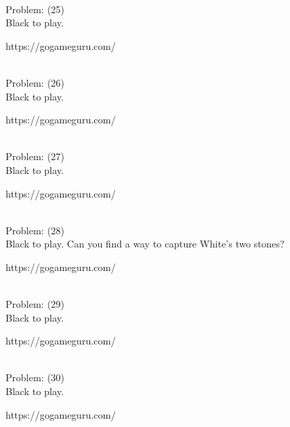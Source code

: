 \documentclass[11pt]{article}
\begin{document}
\begin{minipage}[t]{0.5\textwidth}
  {\centering
  
\\
  Problem: (25)\\
  Black to play.

https://gogameguru.com/\\
  }
\end{minipage}
\begin{minipage}[t]{0.5\textwidth}
  {\centering
  
\\
  Problem: (26)\\
  Black to play.

https://gogameguru.com/\\
  }
\end{minipage}
\begin{minipage}[t]{0.5\textwidth}
  {\centering
  
\\
  Problem: (27)\\
  Black to play.

https://gogameguru.com/\\
  }
\end{minipage}
\begin{minipage}[t]{0.5\textwidth}
  {\centering
  
\\
  Problem: (28)\\
  Black to play. Can you find a way to capture White's two stones?

https://gogameguru.com/\\
  }
\end{minipage}
\begin{minipage}[t]{0.5\textwidth}
  {\centering
  
\\
  Problem: (29)\\
  Black to play.

https://gogameguru.com/\\
  }
\end{minipage}
\begin{minipage}[t]{0.5\textwidth}
  {\centering
  
\\
  Problem: (30)\\
  Black to play.

https://gogameguru.com/\\
  }
\end{minipage}
\end{document}
